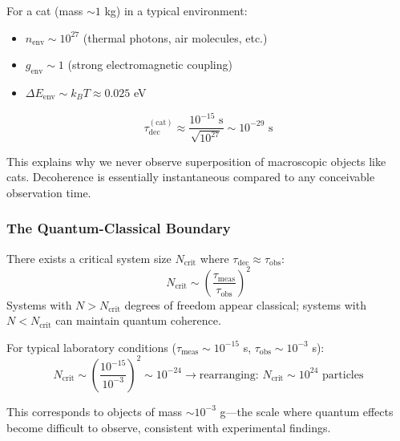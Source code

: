\begin{example}
For a cat (mass $\sim 1$ kg) in a typical environment:
\begin{itemize}
    \item $n_{\text{env}} \sim 10^{27}$ (thermal photons, air molecules, etc.)
    \item $g_{\text{env}} \sim 1$ (strong electromagnetic coupling)
    \item $\Delta E_{\text{env}} \sim k_B T \approx 0.025$ eV
\end{itemize}

\begin{equation}
    \tau_{\text{dec}}^{(\text{cat})} \approx \frac{10^{-15} \text{ s}}{\sqrt{10^{27}}} \sim 10^{-29} \text{ s}
\end{equation}

This explains why we never observe superposition of macroscopic objects like cats. Decoherence is essentially instantaneous compared to any conceivable observation time.
\end{example}

\subsubsection{The Quantum-Classical Boundary}

\begin{theorem}
There exists a critical system size $N_{\text{crit}}$ where $\tau_{\text{dec}} \approx \tau_{\text{obs}}$:
\begin{equation}
    N_{\text{crit}} \sim \left(\frac{\tau_{\text{meas}}}{\tau_{\text{obs}}}\right)^2
\end{equation}
Systems with $N > N_{\text{crit}}$ degrees of freedom appear classical; systems with $N < N_{\text{crit}}$ can maintain quantum coherence.
\end{theorem}

For typical laboratory conditions ($\tau_{\text{meas}} \sim 10^{-15}$ s, $\tau_{\text{obs}} \sim 10^{-3}$ s):
\begin{equation}
    N_{\text{crit}} \sim \left(\frac{10^{-15}}{10^{-3}}\right)^2 \sim 10^{-24} \to \text{rearranging: } N_{\text{crit}} \sim 10^{24} \text{ particles}
\end{equation}

This corresponds to objects of mass $\sim 10^{-3}$ g—the scale where quantum effects become difficult to observe, consistent with experimental findings.

